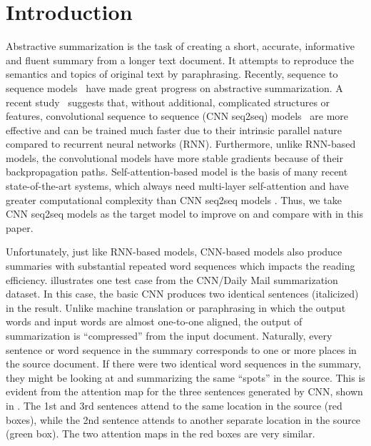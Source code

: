 \section{Introduction}
\label{sec:intro}

Abstractive summarization is the task of creating a short, accurate,
informative and fluent summary from a longer text document.
It attempts to reproduce the semantics and topics of original text
by paraphrasing. 
Recently, sequence to sequence
models~\citep{RushCW15,ChopraAR16,NallapatiZSGX16,SeeLM17,PaulusXS17}
have made great progress on abstractive summarization.
A recent study~\citep{bai2018empirical} suggests that, 
without additional, complicated structures or features,
convolutional sequence to sequence 
(CNN seq2seq) models~\citep{gehring2017convs2s,FanGA18,LiuLZ18} 
are more effective and can be trained much faster due to 
their intrinsic parallel nature compared to recurrent neural networks (RNN).
Furthermore, unlike RNN-based models, 
the convolutional models have more stable gradients 
because of their backpropagation paths. 
Self-attention-based model is 
the basis of many recent state-of-the-art systems,
which always need multi-layer self-attention and have greater computational complexity than CNN seq2seq models \citep{CompareTrans}.
Thus, we take CNN seq2seq models as the target model to improve on and
compare with in this paper.

Unfortunately, just like RNN-based models, CNN-based models also produce
summaries with substantial repeated word sequences which impacts the reading efficiency.
 illustrates one 
test case from the CNN/Daily Mail summarization dataset. 
In this case, the basic CNN produces two 
identical sentences (italicized) in the result. 
Unlike machine translation or paraphrasing in which the output words
and input words are almost one-to-one aligned, the output of summarization
is ``compressed'' from the input document. Naturally, every sentence or 
word sequence in the summary corresponds to one or more places in the source
document. If there were two identical word sequences in the summary,
they might be looking at and summarizing the same ``spots'' in the source.
This is evident from the attention map for the three sentences generated by 
CNN, shown in . The 1st and 3rd sentences attend to
the same location in the source (red boxes), 
while the 2nd sentence attends to another separate location in the source (green box). 
The two attention maps in the red boxes are very similar.

